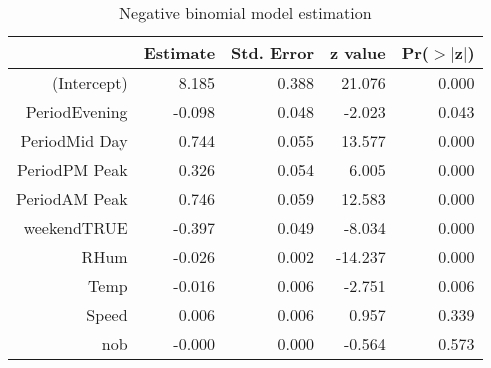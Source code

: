 \begin{table}[ht]
\centering
\begin{tabular}{rrrrr}
  \hline
 & Estimate & Std. Error & z value & Pr($>$$|$z$|$) \\ 
  \hline
(Intercept) & 8.185 & 0.388 & 21.076 & 0.000 \\ 
  PeriodEvening & -0.098 & 0.048 & -2.023 & 0.043 \\ 
  PeriodMid Day & 0.744 & 0.055 & 13.577 & 0.000 \\ 
  PeriodPM Peak & 0.326 & 0.054 & 6.005 & 0.000 \\ 
  PeriodAM Peak & 0.746 & 0.059 & 12.583 & 0.000 \\ 
  weekendTRUE & -0.397 & 0.049 & -8.034 & 0.000 \\ 
  RHum & -0.026 & 0.002 & -14.237 & 0.000 \\ 
  Temp & -0.016 & 0.006 & -2.751 & 0.006 \\ 
  Speed & 0.006 & 0.006 & 0.957 & 0.339 \\ 
  nob & -0.000 & 0.000 & -0.564 & 0.573 \\ 
   \hline
\end{tabular}
\caption{Negative binomial model estimation} 
\end{table}
